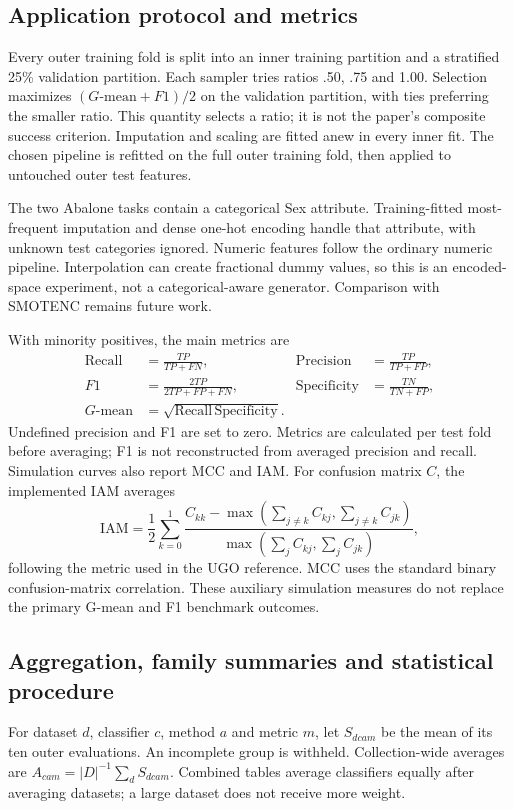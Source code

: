 \documentclass[conference]{IEEEtran}
\begin{document}
\subsection{Application protocol and metrics}
Every outer training fold is split into an inner training partition and a stratified 25\% validation partition. Each sampler tries ratios .50, .75 and 1.00. Selection maximizes $(G\text{-mean}+F1)/2$ on the validation partition, with ties preferring the smaller ratio. This quantity selects a ratio; it is not the paper's composite success criterion. Imputation and scaling are fitted anew in every inner fit. The chosen pipeline is refitted on the full outer training fold, then applied to untouched outer test features.

The two Abalone tasks contain a categorical Sex attribute. Training-fitted most-frequent imputation and dense one-hot encoding handle that attribute, with unknown test categories ignored. Numeric features follow the ordinary numeric pipeline. Interpolation can create fractional dummy values, so this is an encoded-space experiment, not a categorical-aware generator. Comparison with SMOTENC remains future work.

With minority positives, the main metrics are
\begin{align}
\mathrm{Recall}&=\frac{TP}{TP+FN}, &\mathrm{Precision}&=\frac{TP}{TP+FP},\\
F1&=\frac{2TP}{2TP+FP+FN}, &\mathrm{Specificity}&=\frac{TN}{TN+FP},\\
G\text{-mean}&=\sqrt{\mathrm{Recall}\,\mathrm{Specificity}}.
\end{align}
Undefined precision and F1 are set to zero. Metrics are calculated per test fold before averaging; F1 is not reconstructed from averaged precision and recall. Simulation curves also report MCC and IAM. For confusion matrix $C$, the implemented IAM averages
\begin{equation}\mathrm{IAM}=\frac{1}{2}\sum_{k=0}^{1}\frac{C_{kk}-\max(\sum_{j\ne k}C_{kj},\sum_{j\ne k}C_{jk})}{\max(\sum_jC_{kj},\sum_jC_{jk})},\end{equation}
following the metric used in the UGO reference. MCC uses the standard binary confusion-matrix correlation. These auxiliary simulation measures do not replace the primary G-mean and F1 benchmark outcomes.

\subsection{Aggregation, family summaries and statistical procedure}
For dataset $d$, classifier $c$, method $a$ and metric $m$, let $S_{dcam}$ be the mean of its ten outer evaluations. An incomplete group is withheld. Collection-wide averages are $A_{cam}=|D|^{-1}\sum_dS_{dcam}$. Combined tables average classifiers equally after averaging datasets; a large dataset does not receive more weight.
\end{document}
